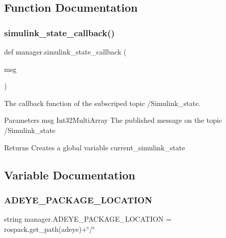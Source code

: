 \subsection{Function Documentation}
\mbox{\label{namespacemanager_ae7c336047eda26124f4453e77f436139}} 
\subsubsection{\texorpdfstring{simulink\+\_\+state\+\_\+callback()}{simulink\_state\_callback()}}
{\footnotesize\ttfamily def manager.\+simulink\+\_\+state\+\_\+callback (\begin{DoxyParamCaption}\item[{}]{msg }\end{DoxyParamCaption})}



The callback function of the subscriped topic /\+Simulink\+\_\+state. 

\begin{DoxyParagraph}{Parameters}
msg Int32\+Multi\+Array The published message on the topic /\+Simulink\+\_\+state
\end{DoxyParagraph}
\begin{DoxyReturn}{Returns}
Creates a global variable current\+\_\+simulink\+\_\+state 
\end{DoxyReturn}


\subsection{Variable Documentation}
\mbox{\label{namespacemanager_a6b9923a9dbb3360028e139c3391d3a26}} 
\subsubsection{\texorpdfstring{A\+D\+E\+Y\+E\+\_\+\+P\+A\+C\+K\+A\+G\+E\+\_\+\+L\+O\+C\+A\+T\+I\+ON}{ADEYE\_PACKAGE\_LOCATION}}
{\footnotesize\ttfamily string manager.\+A\+D\+E\+Y\+E\+\_\+\+P\+A\+C\+K\+A\+G\+E\+\_\+\+L\+O\+C\+A\+T\+I\+ON = rospack.\+get\+\_\+path(\textquotesingle{}adeye\textquotesingle{})+\char`\"{}/\char`\"{}}

